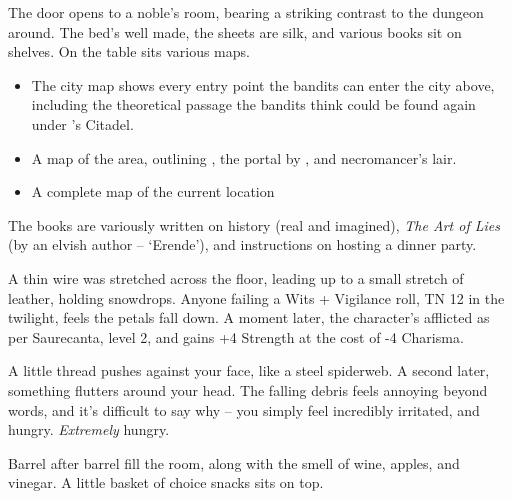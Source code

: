 \begin{multicols}{2}

\begin{boxtext}
  The door opens to a noble's room, bearing a striking contrast to the dungeon around.  The bed's well made, the sheets are silk, and various books sit on shelves.  On the table sits various maps.
\end{boxtext}

\begin{itemize}

  \item
  The city map shows every entry point the bandits can enter the city above, including the theoretical passage the bandits think could be found again under 's Citadel.

  \item
  A map of the area, outlining , the portal by , and \gls{necromancer}'s lair.

  \item
  A complete map of the current location

\end{itemize}

The books are variously written on history (real and imagined), \textit{The Art of Lies} (by an elvish author -- `Erende'), and instructions on hosting a dinner party.


A thin wire was stretched across the floor, leading up to a small stretch of leather, holding snowdrops.  Anyone failing a Wits + Vigilance roll, TN 12 in the twilight, feels the petals fall down.  A moment later, the character's afflicted as per Saurecanta, level 2, and gains +4 Strength at the cost of -4 Charisma.

\begin{boxtext}

  A little thread pushes against your face, like a steel spiderweb.
  A second later, something flutters around your head.
  The falling debris feels annoying beyond words, and it's difficult to say why -- you simply feel incredibly irritated, and hungry.
  \emph{Extremely} hungry.

\end{boxtext}


\begin{boxtext}

  Barrel after barrel fill the room, along with the smell of wine, apples, and vinegar.  A little basket of choice snacks sits on top.


\end{boxtext}
\end{multicols}
